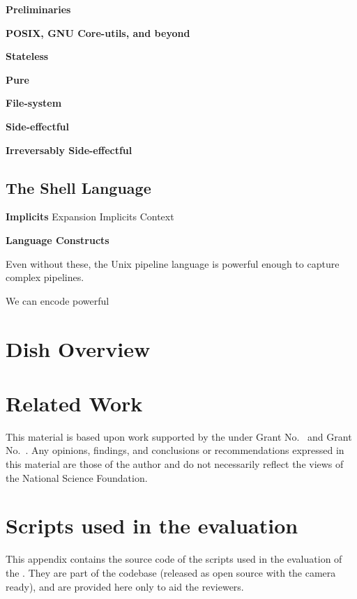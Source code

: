 \documentclass[sigplan,10pt,review,anonymous]{acmart}
\newcommand{\heading}[1]{\vspace{4pt}\noindent\textbf{#1}\enspace}
\begin{document}
\heading{Preliminaries}

\heading{POSIX, GNU Core-utils, and beyond}

\heading{Stateless}

\heading{Pure}

\heading{File-system}

\heading{Side-effectful}

\heading{Irreversably Side-effectful}

\subsection{The Shell Language}
\label{bg:shell}

\heading{Implicits}
Expansion
Implicits
Context

\heading{Language Constructs}

Even without these, the Unix pipeline language is powerful enough to capture complex pipelines.

We can encode powerful

\section{Dish Overview}

\section{Related Work}

\begin{acks}
  This material is based upon work supported by the
   under Grant
  No.~ and Grant
  No.~.  Any opinions, findings, and
  conclusions or recommendations expressed in this material are those
  of the author and do not necessarily reflect the views of the
  National Science Foundation.
\end{acks}





\appendix
\section{Scripts used in the evaluation}

This appendix contains the source code of the scripts used in the evaluation of
the \sys. They are part of the codebase (released as open source with the camera
ready), and are provided here only to aid the reviewers.
\end{document}
